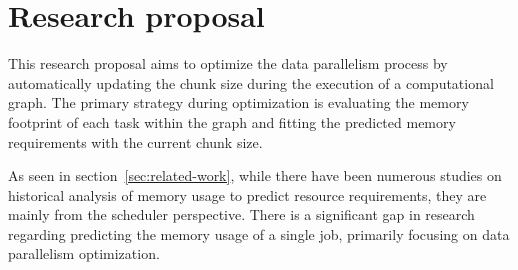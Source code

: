\section{Research proposal}
\label{sec:research-proposal}

This research proposal aims to optimize the data parallelism process by automatically updating the chunk size during the execution of a computational graph.
The primary strategy during optimization is evaluating the memory footprint of each task within the graph and fitting the predicted memory requirements with the current chunk size.

As seen in section~\ref{sec:related-work}, while there have been numerous studies on historical analysis of memory usage to predict resource requirements, they are mainly from the scheduler perspective.
There is a significant gap in research regarding predicting the memory usage of a single job, primarily focusing on data parallelism optimization.







